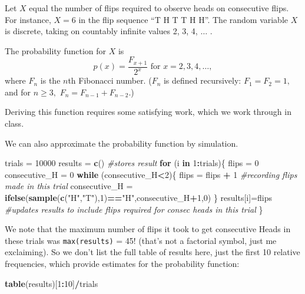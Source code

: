 \documentclass[
]{book}
\newenvironment{Shaded}{\begin{snugshade}}{\end{snugshade}}
\newcommand{\CommentTok}[1]{\textcolor[rgb]{0.56,0.35,0.01}{\textit{#1}}}
\newcommand{\ControlFlowTok}[1]{\textcolor[rgb]{0.13,0.29,0.53}{\textbf{#1}}}
\newcommand{\DecValTok}[1]{\textcolor[rgb]{0.00,0.00,0.81}{#1}}
\newcommand{\FunctionTok}[1]{\textcolor[rgb]{0.13,0.29,0.53}{\textbf{#1}}}
\newcommand{\NormalTok}[1]{#1}
\newcommand{\OtherTok}[1]{\textcolor[rgb]{0.56,0.35,0.01}{#1}}
\newcommand{\SpecialCharTok}[1]{\textcolor[rgb]{0.81,0.36,0.00}{\textbf{#1}}}
\newcommand{\StringTok}[1]{\textcolor[rgb]{0.31,0.60,0.02}{#1}}
\theoremstyle{definition}
\theoremstyle{definition}
\theoremstyle{definition}
\theoremstyle{definition}
\theoremstyle{remark}
\begin{document}
Let \(X\) equal the number of flips required to observe heads on consecutive flips. For instance, \(X = 6\) in the flip sequence ``T H T T H H''. The random variable \(X\) is discrete, taking on countably infinite values 2, 3, 4, \(\ldots\) .

The probability function for \(X\) is \[p(x) = \frac{F_{x+1}}{2^x} \text{     for } x = 2, 3, 4, \ldots,\] where \(F_n\) is the \(n\)th Fibonacci number. (\(F_n\) is defined recursively: \(F_1 = F_2 = 1,\) and for \(n \geq 3,\) \(F_n = F_{n-1}+F_{n-2}\).)

Deriving this function requires some satisfying work, which we work through in class.

We can also approximate the probability function by simulation.

\begin{Shaded}
\begin{Highlighting}[]
\NormalTok{trials }\OtherTok{=} \DecValTok{10000}
\NormalTok{results }\OtherTok{=} \FunctionTok{c}\NormalTok{() }\CommentTok{\#stores result}
\ControlFlowTok{for}\NormalTok{ (i }\ControlFlowTok{in} \DecValTok{1}\SpecialCharTok{:}\NormalTok{trials)\{}
\NormalTok{  flips }\OtherTok{=} \DecValTok{0}
\NormalTok{  consecutive\_H }\OtherTok{=} \DecValTok{0}
  \ControlFlowTok{while}\NormalTok{ (consecutive\_H}\SpecialCharTok{\textless{}}\DecValTok{2}\NormalTok{)\{}
\NormalTok{    flips }\OtherTok{=}\NormalTok{ flips }\SpecialCharTok{+} \DecValTok{1} \CommentTok{\#recording flips made in this trial}
\NormalTok{    consecutive\_H }\OtherTok{=} \FunctionTok{ifelse}\NormalTok{(}\FunctionTok{sample}\NormalTok{(}\FunctionTok{c}\NormalTok{(}\StringTok{"H"}\NormalTok{,}\StringTok{"T"}\NormalTok{),}\DecValTok{1}\NormalTok{)}\SpecialCharTok{==}\StringTok{"H"}\NormalTok{,consecutive\_H}\SpecialCharTok{+}\DecValTok{1}\NormalTok{,}\DecValTok{0}\NormalTok{)}
\NormalTok{  \}}
\NormalTok{  results[i]}\OtherTok{=}\NormalTok{flips }\CommentTok{\#updates results to include flips required for consec heads in this trial}
\NormalTok{\}}
\end{Highlighting}
\end{Shaded}

We note that the maximum number of flips it took to get consecutive Heads in these trials was \texttt{max(results)} = 45! (that's not a factorial symbol, just me exclaiming). So we don't list the full table of results here, just the first 10 relative frequencies, which provide estimates for the probability function:

\begin{Shaded}
\begin{Highlighting}[]
\FunctionTok{table}\NormalTok{(results)[}\DecValTok{1}\SpecialCharTok{:}\DecValTok{10}\NormalTok{]}\SpecialCharTok{/}\NormalTok{trials}
\end{Highlighting}
\end{Shaded}
\end{document}
